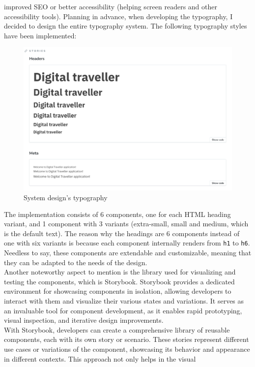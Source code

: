 \documentclass[./memory.tex]{subfiles}
\begin{document}
improved SEO or better accessibility (helping screen readers and other
accessibility tools). Planning in advance, when developing the typography, I
decided to design the entire typography system. The following typography styles
have been implemented:
\begin{figure}[H]
	\centering
	\includegraphics[width=\textwidth]{./assets/designs/typography.png}
	\caption{System design's typography}
\end{figure}
The implementation consists of 6 components, one for each HTML heading variant,
and 1 component with 3 variants (extra-small, small and medium, which is the
default text). The reason why the headings are 6 components instead of one with
six variants is because each component internally renders from \texttt{h1} to
\texttt{h6}. Needless to say, these components are extendable and customizable,
meaning that they can be adapted to the needs of the design.
\\[8pt]
Another noteworthy aspect to mention is the library used for visualizing and
testing the components, which is Storybook. Storybook provides a dedicated
environment for showcasing components in isolation, allowing developers to
interact with them and visualize their various states and variations. It serves
as an invaluable tool for component development, as it enables rapid
prototyping, visual inspection, and iterative design improvements.
\\
With Storybook, developers can create a comprehensive library of reusable
components, each with its own story or scenario. These stories represent
different use cases or variations of the component, showcasing its behavior and
appearance in different contexts. This approach not only helps in the visual
\end{document}
